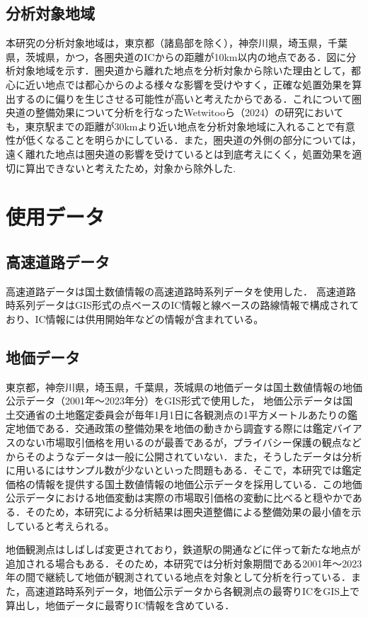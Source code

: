 \subsection{分析対象地域}
本研究の分析対象地域は，東京都（諸島部を除く），神奈川県，埼玉県，千葉県，茨城県，かつ，各圏央道のICからの距離が10km以内の地点である．図に分析対象地域を示す．圏央道から離れた地点を分析対象から除いた理由として，都心に近い地点では都心からのよる様々な影響を受けやすく，正確な処置効果を算出するのに偏りを生じさせる可能性が高いと考えたからである．これについて圏央道の整備効果について分析を行なったWetwitooら（2024）\cite{Weteitoo2024}の研究においても，東京駅までの距離が30kmより近い地点を分析対象地域に入れることで有意性が低くなることを明らかにしている．また，圏央道の外側の部分については，遠く離れた地点は圏央道の影響を受けているとは到底考えにくく，処置効果を適切に算出できないと考えたため，対象から除外した.

\section{使用データ}

\subsection{高速道路データ}
高速道路データは国土数値情報の高速道路時系列データを使用した．
高速道路時系列データはGIS形式の点ベースのIC情報と線ベースの路線情報で構成されており、IC情報には供用開始年などの情報が含まれている。

\subsection{地価データ}
東京都，神奈川県，埼玉県，千葉県，茨城県の地価データは国土数値情報の地価公示データ（2001年〜2023年分）をGIS形式で使用した，
地価公示データは国土交通省の土地鑑定委員会が毎年1月1日に各観測点の1平方メートルあたりの鑑定地価である．交通政策の整備効果を地価の動きから調査する際には鑑定バイアスのない市場取引価格を用いるのが最善であるが，プライバシー保護の観点などからそのようなデータは一般に公開されていない．また，そうしたデータは分析に用いるにはサンプル数が少ないといった問題もある．そこで，本研究では鑑定価格の情報を提供する国土数値情報の地価公示データを採用している．\cite{shimizu2006}\cite{kunimi2021}この地価公示データにおける地価変動は実際の市場取引価格の変動に比べると穏やかである．そのため，本研究による分析結果は圏央道整備による整備効果の最小値を示していると考えられる。

地価観測点はしばしば変更されており，鉄道駅の開通などに伴って新たな地点が追加される場合もある．そのため，本研究では分析対象期間である2001年～2023年の間で継続して地価が観測されている地点を対象として分析を行っている．また，高速道路時系列データ，地価公示データから各観測点の最寄りICをGIS上で算出し，地価データに最寄りIC情報を含めている．

